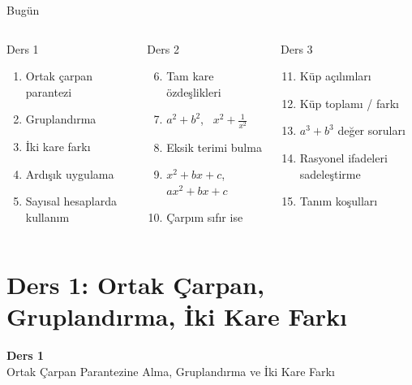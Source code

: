 \documentclass[aspectratio=169,11pt,handout]{beamer}
\begin{document}
\begin{frame}{Bugün}
\begin{columns}[t]
\begin{block}{Ders 1}
\begin{enumerate}
\item Ortak çarpan parantezi
\item Gruplandırma
\item İki kare farkı
\item Ardışık uygulama
\item Sayısal hesaplarda kullanım
\end{enumerate}
\end{block}
\begin{block}{Ders 2}
\begin{enumerate}\setcounter{enumi}{5}
\item Tam kare özdeşlikleri
\item \(a^2+b^2\), \ \(x^2+\frac{1}{x^2}\)
\item Eksik terimi bulma
\item \(x^2+bx+c\), \ \(ax^2+bx+c\)
\item Çarpım sıfır ise
\end{enumerate}
\end{block}
\begin{block}{Ders 3}
\begin{enumerate}\setcounter{enumi}{10}
\item Küp açılımları
\item Küp toplamı / farkı
\item \(a^3+b^3\) değer soruları
\item Rasyonel ifadeleri sadeleştirme
\item Tanım koşulları
\end{enumerate}
\end{block}
\end{columns}
\end{frame}

\section{Ders 1: Ortak Çarpan, Gruplandırma, İki Kare Farkı}
\begin{frame}
\centering\Large\color{anamavi}\textbf{Ders 1}\\[6pt]\normalsize Ortak Çarpan Parantezine Alma, Gruplandırma ve İki Kare Farkı
\end{frame}
\end{document}
